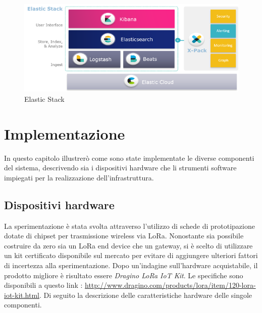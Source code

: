 \documentclass[12pt,a4paper,openright,twoside]{report}
\begin{document}
\begin{figure}[h]                      
\begin{center} 
\includegraphics[width=\textwidth]{elasticstack.png}
\caption[Elastic Stack]{Elastic Stack}\label{fig:ventesima}
\end{center}
\end{figure}

\chapter{Implementazione}
In questo capitolo illustrer\`o come sono state implementate le diverse componenti del sistema, descrivendo sia i dispositivi hardware che li strumenti software impiegati per la realizzazione dell'infrastruttura.
 
\section{Dispositivi hardware}
La sperimentazione \`e stata svolta attraverso l'utilizzo di schede di prototipazione dotate di chipset per trasmissione wireless via LoRa.
Nonostante sia possibile costruire da zero sia un LoRa end device che un gateway, si \`e scelto di utilizzare un kit certificato disponibile sul mercato per evitare di aggiungere ulteriori fattori di incertezza alla sperimentazione.
Dopo un'indagine sull'hardware acquistabile, il prodotto migliore \`e risultato essere \textit{Dragino LoRa IoT Kit}. 
Le specifiche sono disponibili a questo link : \url{http://www.dragino.com/products/lora/item/120-lora-iot-kit.html}.
Di seguito la descrizione delle caratteristiche hardware delle singole componenti. \
\\
\end{document}
